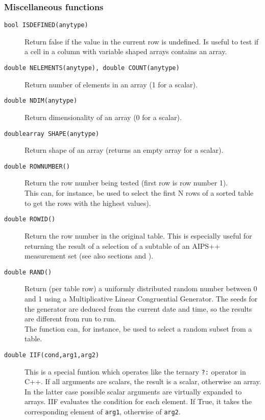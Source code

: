 \subsubsection{Miscellaneous functions}
\begin{description}
  \item[ \texttt{bool ISDEFINED(anytype)}]
    Return false if the value in the current row is undefined. Is
    useful to test if a cell in a column with variable shaped arrays
    contains an array.
  \item[ \texttt{double NELEMENTS(anytype), double COUNT(anytype)}]
    Return number of elements in an array (1 for a scalar).
  \item[ \texttt{double NDIM(anytype)}]
    Return dimensionality of an array (0 for a scalar).
  \item[ \texttt{doublearray SHAPE(anytype)}]
    Return shape of an array (returns an empty array for a scalar).
  \item[ \texttt{double ROWNUMBER()}]
       Return the row number being tested (first row is row number 1).
       \\This can, for instance, be used to select the first N rows
       of a sorted table to get the rows with the highest values).
  \item[ \texttt{double ROWID()}]
       Return the row number in the original table. This is especially
       useful for returning the result of a selection of a subtable
       of an AIPS++ measurement set
       (see also sections 
       and ).
  \item[ \texttt{double RAND()}]
       Return (per table row) a uniformly distributed random number
       between 0 and 1 using a Multiplicative Linear Congruential Generator.
       The seeds for the generator are deduced from the current date and
       time, so the results are different from run to run.
       \\The function can, for instance, be used to select a random
       subset from a table.
  \item[ \texttt{double IIF(cond,arg1,arg2)}]
       This is a special funtion which operates like the ternary \texttt{?:}
       operator in C++. 
       If all arguments are scalars, the result is a scalar, otherwise
       an array. In the latter case possible scalar arguments are
       virtually expanded to arrays.
       IIF evaluates the condition for each element. If True, it takes
       the corresponding element of \texttt{arg1}, otherwise of \texttt{arg2}.
\end{description}

